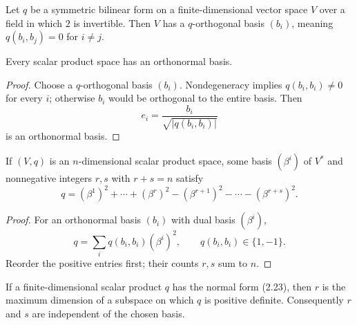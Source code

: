 \begin{proposition}
\label{prop:symmetric-bilinear-orthogonal-basis}
\mathlibok
Let $q$ be a symmetric bilinear form on a finite-dimensional vector space $V$
over a field in which $2$ is invertible. Then $V$ has a $q$-orthogonal basis
$(b_i)$, meaning $q(b_i,b_j)=0$ for $i\ne j$.
\end{proposition}

\begin{proposition}
\label{prop:scalar-product-orthonormal-basis}
\leanok
{}
Every scalar product space has an orthonormal basis.
\end{proposition}

\begin{proof}
\leanok
{}
\sketch Choose a $q$-orthogonal basis $(b_i)$. Nondegeneracy implies
$q(b_i,b_i)\ne0$ for every $i$; otherwise $b_i$ would be orthogonal to the entire
basis. Then
\[
e_i=\frac{b_i}{\sqrt{|q(b_i,b_i)|}}
\]
is an orthonormal basis.
\end{proof}

\begin{corollary}
\label{cor:scalar-product-signature-form}
\leanok
{}
If $(V,q)$ is an $n$-dimensional scalar product space, some basis $(\beta^i)$ of
$V^*$ and nonnegative integers $r,s$ with $r+s=n$ satisfy
\begin{equation}
q=(\beta^1)^2+\cdots+(\beta^r)^2
 -(\beta^{r+1})^2-\cdots-(\beta^{r+s})^2. \tag{2.23}
\end{equation}
\end{corollary}

\begin{proof}
\leanok
{}
\sketch For an orthonormal basis $(b_i)$ with dual basis $(\beta^i)$,
\[
q=\sum_iq(b_i,b_i)(\beta^i)^2,
\qquad q(b_i,b_i)\in\{1,-1\}.
\]
Reorder the positive entries first; their counts $r,s$ sum to $n$.
\end{proof}

\begin{proposition}
\label{prop:sylvesters-law-inertia}
\leanok
{}
If a finite-dimensional scalar product $q$ has the normal form (2.23), then $r$
is the maximum dimension of a subspace on which $q$ is positive definite.
Consequently $r$ and $s$ are independent of the chosen basis.
\end{proposition}

